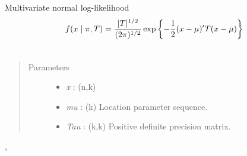 \documentclass[letterpaper,10pt,english]{sphinxmanual}
\begin{document}
\begin{fulllineitems}
\label{distributions:pymc.distributions.mv_normal_like}
Multivariate normal log-likelihood
\begin{gather}
\begin{split}f(x \mid \pi, T) = \frac{|T|^{1/2}}{(2\pi)^{1/2}} \exp\left\{ -\frac{1}{2} (x-\mu)^{\prime}T(x-\mu) \right\}\end{split}\notag\\\begin{split}\end{split}\notag
\end{gather}\begin{quote}\begin{description}
\item[{Parameters }] \leavevmode\begin{itemize}
\item {} 
\emph{x} : (n,k)

\item {} 
\emph{mu} : (k) Location parameter sequence.

\item {} 
\emph{Tau} : (k,k) Positive definite precision matrix.

\end{itemize}

\end{description}\end{quote}




{\hyperref[distributions:pymc.distributions.mv_normal_chol_like]{}}, {\hyperref[distributions:pymc.distributions.mv_normal_cov_like]{}}



\end{fulllineitems}

\end{document}
